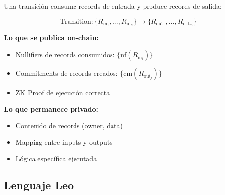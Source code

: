 \documentclass[11pt,a4paper,twoside]{book}
\theoremstyle{definition}
\theoremstyle{remark}
\begin{document}
\begin{mathnote}
Una transición consume records de entrada y produce records de salida:

\[
\text{Transition}: \{R_{\text{in}_1}, ..., R_{\text{in}_n}\} \rightarrow \{R_{\text{out}_1}, ..., R_{\text{out}_m}\}
\]

\textbf{Lo que se publica on-chain:}
\begin{itemize}
    \item Nullifiers de records consumidos: $\{\text{nf}(R_{\text{in}_i})\}$
    \item Commitments de records creados: $\{\text{cm}(R_{\text{out}_j})\}$
    \item ZK Proof de ejecución correcta
\end{itemize}

\textbf{Lo que permanece privado:}
\begin{itemize}
    \item Contenido de records (owner, data)
    \item Mapping entre inputs y outputs
    \item Lógica específica ejecutada
\end{itemize}
\end{mathnote}

\subsection{Lenguaje Leo}
\end{document}
